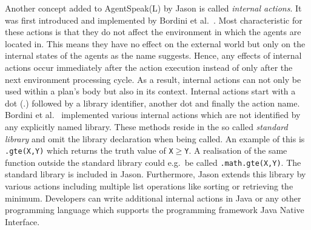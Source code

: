 Another concept added to AgentSpeak(L) by Jason is called \emph{internal actions}.
It was first introduced and implemented by Bordini et al.~\cite{bordini_agentspeak_2002}.
Most characteristic for these actions is that they do not affect the environment in which the agents are located in.
This means they have no effect on the external world but only on the internal states of the agents as the name suggests.
Hence, any effects of internal actions occur immediately after the action execution instead of only after the next environment processing cycle.
As a result, internal actions can not only be used within a plan's body but also in its context. %
Internal actions start with a dot (.) followed by a library identifier, another dot and finally the action name.
Bordini et al.~\cite{bordini_agentspeak_2002} implemented various internal actions which are not identified by any explicitly named library.
These methods reside in the so called \emph{standard library} and omit the library declaration when being called.
An example of this is \texttt{.gte(X,Y)} which returns the truth value of \texttt{X}$\geq$\texttt{Y}.
A realisation of the same function outside the standard library could e.g.\ be called \texttt{.math.gte(X,Y)}.
The standard library is included in Jason.
Furthermore, Jason extends this library by various actions including multiple list operations like sorting or retrieving the minimum.
Developers can write additional internal actions in Java or any other programming language which supports the programming framework Java Native Interface. %

